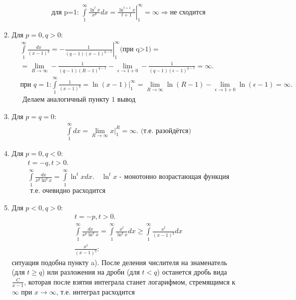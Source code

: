 \documentclass[a4paper, 12pt]{article}
\begin{document}
\begin{enumerate}
\begin{enumerate}
\begin{align*}
      &\text{для p=1: }\int\limits_1^\infty\frac{\ln^t x}{x^p}dx = \left.\frac{\ln^{t+1}x}{t+1}\right|_1^\infty = \infty \Rightarrow \text{не сходится}
     \end{align*}
     \item
     Для $p=0, q>0$:
     \begin{align*}
      &\int\limits_1^\infty \frac{dx}{(x-1)^q} =
     \left.-\frac{1}{(q-1)(x-1)^{q-1}}\right|_1^\infty \text{(при q>1)} = \\ 
     &=\lim_{R \to \infty}-\frac{1}{(q-1)(R-1)^{q-1}} - 
     \lim_{\epsilon \to 1+0}-\frac{1}{(q-1)(\epsilon-1)^{q-1}} =
     \infty. \\ 
     &\text{при $q=1$:} \int\limits_1^\infty \frac{1}{(x-1)^q} =
     \left. \ln (x-1) \right|_1^\infty = 
     \lim_{R \to \infty} \ln (R-1) - \lim_{\epsilon \to 1+0} \ln (\epsilon -1) = \infty. \\
     &\text{ Делаем аналогичный пункту 1 вывод}
     \end{align*}
     \item
     Для $p=q=0$:
     \begin{align*}
      &\int\limits_1^\infty dx = \lim_{R \to \infty} x \Big|_1^R = \infty. \text{ (т.е. разойдётся)}
     \end{align*}
     \item
     Для $p=0,q<0$:
     \begin{align*}
      &t = -q, t>0. \\
      &\int\limits_1^\infty \frac{dx}{x^p\ln^qx} =
      \int\limits_1^\infty \ln^t x dx.\quad \text{$\ln^t x$ - монотонно возрастающая функция} \\
      &\text{ т.е. очевидно расходится}
     \end{align*}
     \item
     Для $p < 0, q > 0$:
     \begin{align*}
      &t = -p, t>0. \\
      &\int\limits_1^\infty\frac{dx}{x^p\ln^qx} = 
      \int\limits_1^\infty\frac{x^t}{\ln^qx}dx \geq 
      \int\limits_1^\infty\frac{x^t}{(x-1)^q}dx \\
      &\frac{x^t}{(x-1)^q}:
     \end{align*}
     ситуация подобна пункту a). После деления числителя на знаменатель (для $t \geq q$) или разложения на дроби (для $t<q$) останется дробь вида $\frac{C}{x-1}$, которая после взятия интеграла станет логарифмом, стремящимся к $\infty$ при $x\to\infty$, т.е. интеграл расходится \\

\end{enumerate}
\end{enumerate}
\end{document}
